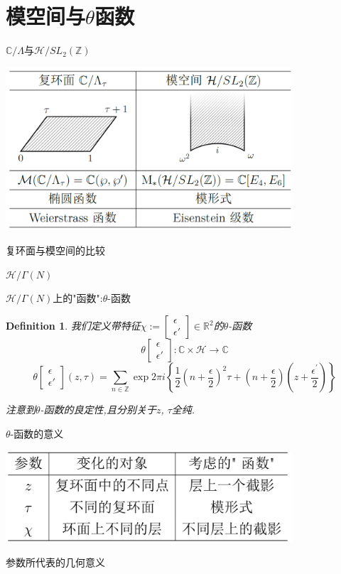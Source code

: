 \documentclass[pdf]{beamer}
\numberwithin{equation}{section}
\theoremstyle{plain}
\newtheorem{defn}[theorem]{Definition}
\theoremstyle{plain}
\theoremstyle{remark}
\newcommand{\character}[2]{\left[\begin{array}{c}{#1} \\ {#2}\end{array}\right]}
\newcommand{\normalcharacter}{\character{\epsilon}{\epsilon'}}
\begin{document}
\section{模空间与$\theta$函数}
	\begin{frame}{$\mathbb{C}/\Lambda$与$\mathcal{H}/SL_2(\mathbb{Z})$}
\begin{table}[ht]
	\centering
	\includegraphics[width=0.8\textwidth]{snip/table-torus-moduli.png}
	\caption{复环面与模空间的比较}
	\label{tb:torus-moduli}
\end{table}
\end{frame}
\begin{frame}{$\mathcal{H}/\Gamma(N)$}
\end{frame}
\begin{frame}{$\mathcal{H}/\Gamma(N)$上的"函数":$\theta$-函数}
\begin{defn}
	我们定义带特征$\chi:=\normalcharacter \in \mathbb{R}^2$的$\theta$-函数
	$$\theta\normalcharacter : 
	\mathbb{C} \times \mathcal{H} \longrightarrow \mathbb{C}$$
	$$\theta\normalcharacter(z, \tau)=\sum_{n \in \mathbb{Z}} \exp 2 \pi i \left\{\frac{1}{2}\left(n+\frac{\epsilon}{2}\right)^{2} \tau+\left(n+\frac{\epsilon}{2}\right)\left(z+\frac{\epsilon^{\prime}}{2}\right)\right\}$$
	
	注意到$\theta$-函数的良定性,且分别关于$z$, $\tau$全纯.
\end{defn}
\end{frame}
\begin{frame}{$\theta$-函数的意义}
\begin{table}[ht]
	\centering
	\includegraphics[width=0.8\textwidth]{snip/table-geomean.png}
	\caption{参数所代表的几何意义}
\end{table}
\end{frame}
\end{document}
